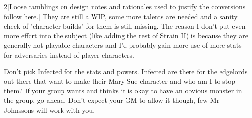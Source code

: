 \documentclass{book}
\begin{document}
\begin{multicols}{2}[Loose ramblings on design notes and rationales used to justify the conversions follow here.]
They are still a WIP, some more talents are needed and a sanity check of "character builds" for them is still missing. The reason I don't put even more effort into the subject (like adding the rest of Strain II) is because they are generally not playable characters and I'd probably gain more use of more stats for adversaries instead of player characters.

Don't pick Infected for the stats and powers. Infected are there for the edgelords out there that want to make their Mary Sue character and who am I to stop them? If your group wants and thinks it is okay to have an obvious monster in the group, go ahead. Don't expect your GM to allow it though, few Mr. Johnssons will work with you.

\hfill{}

\end{multicols}
\end{document}
